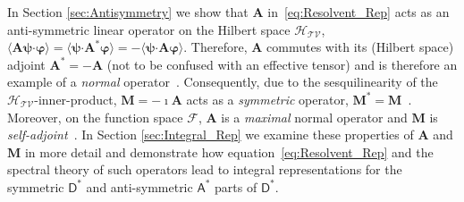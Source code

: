 \documentclass[leqno,onefignum,onetabnum]{siamltex1213}
\newcommand{\Mb}{\mathbf{M}}
\newcommand{\Ab}{\mathbf{A}}
\newcommand{\Tc}{\mathcal{T}}
\newcommand{\Vc}{\mathcal{V}}
\newcommand{\Hc}{\mathcal{H}}
\newcommand{\Fc}{\mathcal{F}}
\newcommand{\Dm}{\mathsf{D}}
\newcommand{\Am}{\mathsf{A}}
\providecommand\bcdot{\boldsymbol{\cdot}}
\newcommand{\vecpsi}{\boldsymbol{\psi}}
\newcommand{\vecvarphi}{\boldsymbol{\varphi}}
\begin{document}
In Section \ref{sec:Antisymmetry} we show that $\Ab$
in~\eqref{eq:Resolvent_Rep} acts as an anti-symmetric linear operator
on the Hilbert space $\Hc_{\Tc\Vc}$,
$\langle\Ab\vecpsi\bcdot\vecvarphi\rangle=\langle\vecpsi\bcdot\Ab^*\vecvarphi\rangle=-\langle\vecpsi\bcdot\Ab\vecvarphi\rangle$. Therefore,
$\Ab$ commutes with its (Hilbert space) adjoint $\Ab^*=-\Ab$ (not to
be confused with an effective tensor) and is therefore an example of a
\emph{normal} operator~\cite{Stone:64}. Consequently, due to the
sesquilinearity of the $\Hc_{\Tc\Vc}$-inner-product, $\Mb=-\imath\Ab$ acts
as a \emph{symmetric} operator,
$\Mb^*=\Mb$~\cite{Reed-1980,Stone:64}. Moreover, on the function space
$\Fc$, 
$\Ab$ is a \emph{maximal} normal operator and $\Mb$ is
\emph{self-adjoint}~\cite{Stone:64}. In Section \ref{sec:Integral_Rep}
we examine these properties of $\Ab$ and $\Mb$ in more detail and
demonstrate how equation~\eqref{eq:Resolvent_Rep} and the spectral
theory of such operators lead to integral representations for the
symmetric $\Dm^*$ and anti-symmetric $\Am^*$ parts of $\Dm^*$.      
\end{document}
